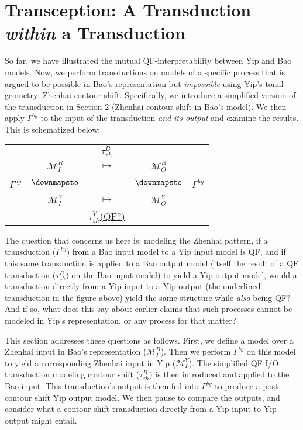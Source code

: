 \documentclass{article}
\begin{document}
\section{Transception: A Transduction \emph{within} a Transduction}
So far, we have illustrated the mutual QF-interpretability between Yip and Bao models. Now, we perform transductions on models of a specific process that is argued to be possible in Bao's representation but \emph{impossible} using Yip's tonal geometry: Zhenhai contour shift. Specifically, we introduce a simplified version of the transduction in Section 2 (Zhenhai contour shift in Bao's model). We then apply $\Gamma^{by}$ to the input of the transduction \emph{and its output} and examine the results. This is schematized below:
\begin{center}
\begin{tabular}{ccccc}
& & {\small$\tau^{B}_{zh}$} \\
& $\mathcal{M}^{B}_{I}$ & {\Large$\mapsto$} & $\mathcal{M}^{B}_{O}$ \\
\hspace{1em} \\
{\small$\Gamma^{by}$} & {\Large$\downmapsto$} & & {\Large$\downmapsto$} & {\small$\Gamma^{by}$} \\ 
\hspace{1em} \\
& $\mathcal{M}^{Y}_{I}$ & {\Large$\mapsto$} & $\mathcal{M}^{Y}_{O}$ \\
& & {\small\underline{$\tau^{Y}_{zh}$(QF?)}} \\
\end{tabular}
\end{center}
The question that concerns us here is: modeling the Zhenhai pattern, if a transduction ($\Gamma^{by}$) from a Bao input model to a Yip input model is QF, and if this same transduction is applied to a Bao output model (itself the result of a QF transduction ($\tau^{B}_{zh}$) on the Bao input model) to yield a Yip output model, would a transduction directly from a Yip input to a Yip output (the underlined transduction in the figure above) yield the same structure while \emph{also} being QF? And if so, what does this say about earlier claims that such processes cannot be modeled in Yip's representation, or any process for that matter? \par
This section addresses these questions as follows. First, we define a model over a Zhenhai input in Bao's representation ($\mathcal{M}^{B}_{I}$). Then we perform $\Gamma^{by}$ on this model to yield a corresponding Zhenhai input in Yip ($\mathcal{M}^{Y}_{I}$). The simplified QF I/O transduction modeling contour shift ($\tau^{B}_{zh}$) is then introduced and applied to the Bao input. This transduction's output is then fed into $\Gamma^{by}$ to produce a post-contour shift Yip output model. We then pause to compare the outputs, and consider what a contour shift transduction directly from a Yip input to Yip output might entail.
\end{document}
